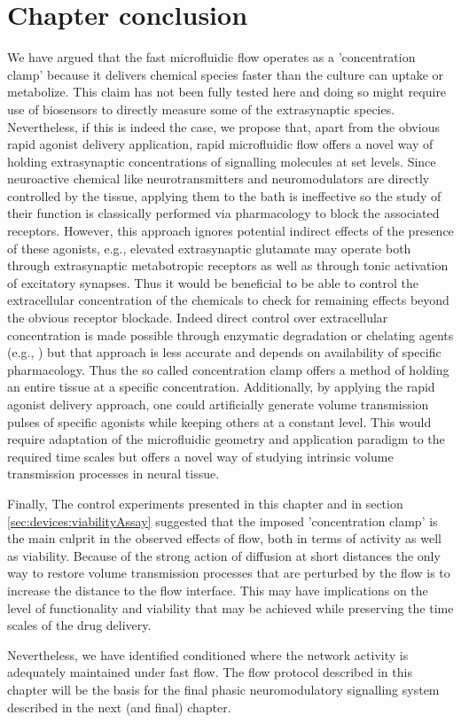 \section{Chapter conclusion}
We have argued that the fast microfluidic flow operates as a 'concentration clamp' because it delivers chemical species faster than the culture can uptake or metabolize. This claim has not been fully tested here and doing so might require use of biosensors to directly measure some of the extrasynaptic species. Nevertheless, if this is indeed the case, we propose that, apart from the obvious rapid agonist delivery application, rapid microfluidic flow offers a novel way of holding extrasynaptic concentrations of signalling molecules at set levels. Since neuroactive chemical like neurotransmitters and neuromodulators are directly controlled by the tissue, applying them to the bath is ineffective so the study of their function is classically performed via pharmacology to block the associated receptors. However, this approach ignores potential indirect effects of the presence of these agonists, e.g., elevated extrasynaptic glutamate may operate both through extrasynaptic metabotropic receptors as well as through tonic activation of excitatory synapses. Thus it would be beneficial to be able to control the extracellular concentration of the chemicals to check for remaining effects beyond the obvious receptor blockade. Indeed direct control over extracellular concentration is made possible through enzymatic degradation or chelating agents (e.g., \cite{wall2002furosemide}) but that approach is less accurate and depends on availability of specific pharmacology. Thus the so called concentration clamp offers a method of holding an entire tissue at a specific concentration. Additionally, by applying the rapid agonist delivery approach, one could artificially generate volume transmission pulses of specific agonists while keeping others at a constant level. This would require adaptation of the microfluidic geometry and application paradigm to the required time scales but offers a novel way of studying intrinsic volume transmission processes in neural tissue.

Finally, The control experiments presented in this chapter and in section \ref{sec:devices:viabilityAssay} suggested that the imposed 'concentration clamp' is the main culprit in the observed effects of flow, both in terms of activity as well as viability. Because of the strong action of diffusion at short distances the only way to restore volume transmission processes that are perturbed by the flow is to increase the distance to the flow interface. This may have implications on the level of functionality and viability that may be achieved while preserving the time scales of the drug delivery.

Nevertheless, we have identified conditioned where the network activity is adequately maintained under fast flow. The flow protocol described in this chapter will be the basis for the final phasic neuromodulatory signalling system described in the next (and final) chapter.
